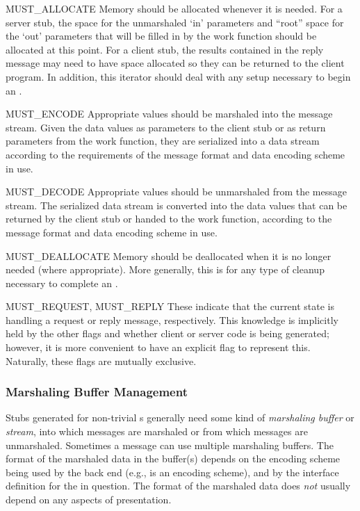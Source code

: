 \begin{cidentifierlist}
  \item[MUST_ALLOCATE]
  Memory should be allocated whenever it is needed.  For a server stub, the
  space for the unmarshaled `in' parameters and ``root'' space for the `out'
  parameters that will be filled in by the work function should be allocated at
  this point.  For a client stub, the results contained in the reply message
  may need to have space allocated so they can be returned to the client
  program.  In addition, this iterator should deal with any setup necessary to
  begin an \RPC{}.

  \item[MUST_ENCODE]
  Appropriate values should be marshaled into the message stream.  Given the
  data values as parameters to the client stub or as return parameters from the
  work function, they are serialized into a data stream according to the
  requirements of the message format and data encoding scheme in use.

  \item[MUST_DECODE]
  Appropriate values should be unmarshaled from the message stream.  The
  serialized data stream is converted into the data values that can be returned
  by the client stub or handed to the work function, according to the message
  format and data encoding scheme in use.

  \item[MUST_DEALLOCATE]
  Memory should be deallocated when it is no longer needed (where appropriate).
  More generally, this is for any type of cleanup necessary to complete an
  \RPC{}.

  \item[MUST_REQUEST, MUST_REPLY]
  These indicate that the current state is handling a request or reply message,
  respectively.  This knowledge is implicitly held by the other flags and
  whether client or server code is being generated; however, it is more
  convenient to have an explicit flag to represent this.  Naturally, these
  flags are mutually exclusive.
\end{cidentifierlist}

\subsubsection{Marshaling Buffer Management}
\label{subsubsec:BE:Marshaling Buffer Management}

Stubs generated for non-trivial \RPC{}s generally need some kind of
\emph{marshaling buffer} or \emph{stream}, into which messages are marshaled or
from which messages are unmarshaled.  Sometimes a message can use multiple
marshaling buffers.  The format of the marshaled data in the buffer(s) depends
on the encoding scheme being used by the back end (e.g., \XDR{} is an encoding
scheme), and by the \MINT{} interface definition for the \RPC{} in question.
The format of the marshaled data does \emph{not} usually depend on any aspects
of presentation.

